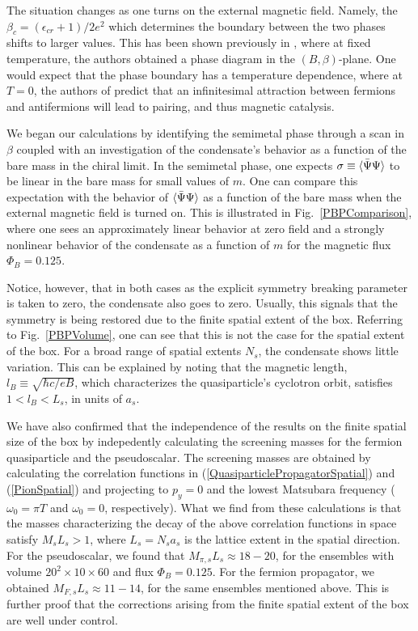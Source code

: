 \documentclass[aps,prd,twocolumn,showpacs,superscriptaddress,groupedaddress]{revtex4}  %
\begin{document}
The situation changes as one turns on the external magnetic field. Namely, the $\beta_c = (\epsilon_{cr}+1)/2e^2$ which determines the boundary between the two phases shifts to larger values. This has been shown previously in \cite{Polikarpov}, where at fixed temperature, the authors
obtained a phase diagram in the $(B, \beta)$-plane. One would expect that the phase boundary has a temperature dependence, where at $T=0$, the authors of \cite{Miransky1,Miransky2,Miransky3,Miransky4,MiranskyGraphene1,MiranskyGraphene2,MiranskyGraphene3} predict that an infinitesimal attraction between fermions and antifermions will lead to pairing, and thus magnetic catalysis.

We began our calculations by identifying the semimetal phase through a scan in $\beta$ coupled with an investigation of the condensate's behavior as a function of the bare mass in the chiral limit. In the semimetal phase, one expects $\sigma \equiv {\langle {\bar \Psi}\Psi \rangle}$ to be linear in the bare mass for small values of $m$. 
One can compare this expectation with the behavior of ${\langle {\bar \Psi} \Psi \rangle}$ as a function of the bare mass when the external magnetic field is turned on. This is illustrated in Fig.~\ref{PBPComparison}, where one sees an approximately linear behavior at zero field and a strongly nonlinear behavior of the condensate as a function of $m$ for the magnetic flux $\Phi_B = 0.125$.

Notice, however, that in both cases as the explicit symmetry breaking parameter is taken to zero, the condensate also goes to zero. Usually, this signals that the symmetry is being restored due to the finite spatial extent of the box. Referring to Fig.~\ref{PBPVolume}, one can see that this is not the
case for the spatial extent of the box. For a broad range of spatial extents $N_s$, the condensate shows little variation. This can be explained by noting that the magnetic length, $l_B \equiv \sqrt{\hbar c/eB}$, which characterizes the quasiparticle's cyclotron orbit, satisfies $1 < l_B < L_s$, in units of $a_s$. 

We have also confirmed that the independence of the results on the finite spatial size of the box by indepedently calculating the screening
masses for the fermion quasiparticle and the pseudoscalar. The screening masses are obtained by calculating the correlation functions in (\ref{QuasiparticlePropagatorSpatial}) and (\ref{PionSpatial}) and projecting to $p_y=0$ and the lowest Matsubara frequency ($\omega_0 = \pi T$ and $\omega_0 = 0$, respectively).
What we find from these calculations is that the masses characterizing the decay of the above correlation functions in space satisfy $M_s L_s > 1$, where $L_s = N_s a_s$ is the  lattice extent in the spatial direction. For the pseudoscalar, we found that $M_{\pi,s}L_s \approx 18-20$, for the ensembles with volume $20^2\times10\times60$ and flux $\Phi_B=0.125$. For the fermion propagator, we obtained $M_{F,s}L_s \approx 11-14$, for the same ensembles mentioned above. This is further proof that the corrections arising from the finite spatial extent of the box 
are well under control.
 
\end{document}
